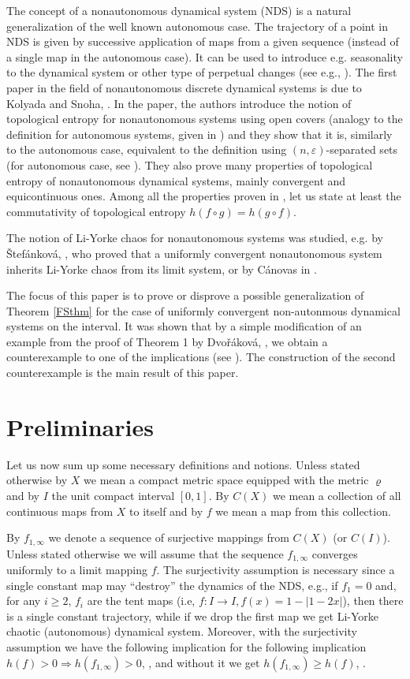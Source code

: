\documentclass{amsart}
\begin{document}
The concept of a nonautonomous dynamical system (NDS) is a natural generalization of the well known autonomous case. The trajectory of a point in NDS is given by successive application of maps from a given sequence (instead of a single map in the autonomous case). It can be used to introduce e.g. seasonality to the dynamical system or other type of perpetual changes (see e.g., \cite{Dengue, China}). The first paper in the field of nonautonomous discrete dynamical systems is due to Kolyada and Snoha, \cite{KS}. In the paper, the authors introduce the notion of topological entropy for nonautonomous systems using open covers (analogy to the definition for autonomous systems, given in \cite{TE1}) and they show that it is, similarly to the autonomous case, equivalent to the definition using $(n,\varepsilon)$-separated sets (for autonomous case, see \cite{TE2}). They also prove many properties of topological entropy of nonautonomous dynamical systems, mainly convergent and equicontinuous ones. Among all the properties proven in \cite{KS}, let us state at least the commutativity of topological entropy $h(f\circ g) = h(g\circ f)$.

The notion of Li-Yorke chaos for nonautonomous systems was studied, e.g. by \v{S}tef\'{a}nkov\'{a}, \cite{Stef}, who proved that a uniformly convergent nonautonomous system inherits Li-Yorke chaos from its limit system, or by C\'{a}novas in \cite{Cano1}.

The focus of this paper is to prove or disprove a possible generalization of Theorem \ref{FSthm} for the case of uniformly convergent non-autonmous dynamical systems on the interval. It was shown that by a simple modification of an example from the proof of Theorem 1 by Dvo\v{r}\'{a}kov\'{a}, \cite{Dvor}, we obtain a counterexample to one of the implications (see \cite{Sot}). The construction of the second counterexample is the main result of this paper.

\section{Preliminaries}

Let us now sum up some necessary definitions and notions. Unless stated otherwise by $X$ we mean a compact metric space equipped with the metric $\varrho$ and by $I$ the unit compact interval $[0,1]$. By $C(X)$ we mean a collection of all continuous maps from $X$ to itself and by $f$ we mean a map from this collection.

By $f_{1,\infty}$ we denote a sequence of surjective mappings from $C(X)$ (or $C(I)$). Unless stated otherwise we will assume that the sequence $f_{1,\infty}$ converges uniformly to a limit mapping $f$. The surjectivity assumption is necessary since a single constant map may ``destroy'' the dynamics of the NDS, e.g., if $f_1 = 0$ and, for any $i\geq2$, $f_i$ are the tent maps (i.e, $f\!\!: I\rightarrow I, f(x) = 1-|1-2x|$), then there is a single constant trajectory, while if we drop the first map we get Li-Yorke chaotic (autonomous) dynamical system. Moreover, with the surjectivity assumption we have the following implication  for the following implication $h(f) > 0 \Rightarrow h(f_{1,\infty}) > 0$, \cite{Cano1}, and without it we get $h(f_{1,\infty}) \geq h(f)$, \cite{KS}.
\end{document}
